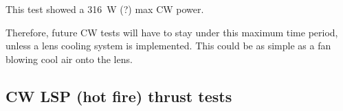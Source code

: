             This test showed a \qty{316}{W} (?) max CW power.

            Therefore, future CW tests will have to stay under this maximum time period, unless a lens cooling system is implemented. This could be as simple as a fan blowing cool air onto the lens.


        \subsection{CW LSP (hot fire) thrust tests}
 

            

        



